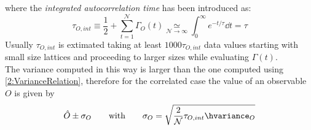 where the \emph{integrated autocorrelation time} has been introduced as:
\begin{equation}
    \tau_{O,int} \equiv \frac12+\sum_{t=1}^\mathcal{N}\Gamma_O(t) \underset{\mathcal{N}\to\infty}{\simeq} \int_0^\infty e^{-t/\tau}\dd t = \tau \label{2:IntAutocorrTime}
\end{equation}
Usually $\tau_{O,int}$ is extimated taking at least $1000\tau_{O,int}$ data values starting with small size lattices and proceeding to larger sizes while evaluating $\Gamma(t)$.\\
The variance computed in this way is larger than the one computed using \eqref{2:VarianceRelation}, therefore for the correlated case the value of an observable $O$ is given by
\begin{equation}
    \hat{O}\pm\sigma_O \qquad\text{with}\qquad \sigma_O = \sqrt{\frac{2}{\mathcal{N}}\tau_{O,int}\hvariance_O} \label{2:FinalMeasureCorr}
\end{equation}
